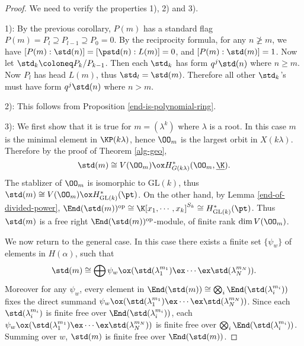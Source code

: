 \begin{proof}
    We need to verify the properties 1), 2) and 3).

    1): By the previous corollary, $P(m)$ has a standard flag
    $P(m) = P_l\supseteq P_{l-1}\supseteq P_0 = 0$. By the 
    reciprocity formula, for any $n\not\ge m$, we have 
    $[P(m):\std(n)] = [\pstd(n):L(m)] = 0$, and $[P(m):\std(m)] = 1$.
    Now let $\std_k \coloneq  P_k/P_{k-1}$. Then each $\std_k$ has form
    $q^j\std(n)$ where $n\ge m$. Now $P_l$ has head $L(m)$,
    thus $\std_l = \std(m)$. Therefore all other $\std_k$'s
    must have form $q^j\std(n)$ where $n>m$.

    2): This follows from Proposition \ref{end-is-polynomial-ring}.

    3): We first show that it is true for $m = (\lambda^k)$ where
    $\lambda$ is a root. In this case $m$ is the minimal element
    in $\KP(k\lambda)$, hence $\OO_m$ is the largest orbit in 
    $X(k\lambda)$. Therefore by the proof of Theorem \ref{alg-geo},
    \[
        \std(m)\cong V(\OO_m)\ox H^*_{G(k\lambda)}(\OO_m,\underline{\K}).
    \]
    The stablizer of $\OO_m$ is isomorphic to $\mathrm{GL}(k)$,
    thus $\std(m)\cong V(\OO_m)\ox H^*_{\mathrm{GL}(k)}(\pt)$.
    On the other hand, by Lemma \ref{end-of-divided-power},
    $\End(\std(m))^{\mathrm{op}}\cong\K[x_1,\cdots,x_k]^{S_k}
    \cong H^*_{\mathrm{GL}(k)}(\pt)$. Thus $\std(m)$ is a 
    free right $\End(\std(m))^{\mathrm{op}}$-module,
    of finite rank $\dim V(\OO_m)$.

    We now return to the general case. In this case there exists 
    a finite set $\{\psi_w\}$ of elements in $H(\alpha)$,
    such that 
    \[
        \std(m)\cong\bigoplus\psi_w\ox(\std(\lambda_1^{m_1})
        \ex\cdots\ex\std(\lambda_N^{m_N})).
    \] 
    Moreover for any $\psi_w$,
    every element in $\End(\std(m))\cong\bigotimes_i\End(\std(\lambda_i^{m_i}))$
    fixes the direct summand $\psi_w\ox(\std(\lambda_1^{m_1})\ex\cdots\ex\std(\lambda_N^{m_N}))$.
    Since each $\std(\lambda_i^{m_i})$ is finite free over 
    $\End(\std(\lambda_i^{m_i}))$, each 
    $\psi_w\ox(\std(\lambda_1^{m_1})\ex\cdots\ex\std(\lambda_N^{m_N}))$
    is finite free over $\bigotimes_i\End(\std(\lambda_i^{m_i}))$.
    Summing over $w$, $\std(m)$ is finite free over $\End(\std(m))$.
\end{proof}
